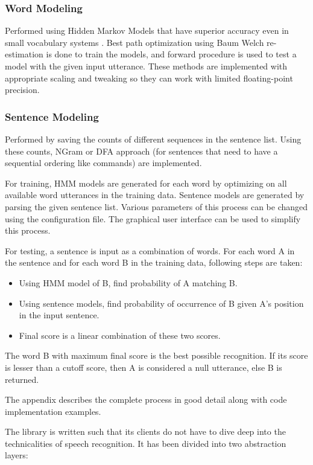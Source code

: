 \subsubsection{Word Modeling}
Performed using Hidden Markov Models that have superior accuracy \cite{Mustafa2017} even in small vocabulary systems \cite{10.1007/978-981-10-3920-1_46}. Best path optimization using Baum Welch re-estimation is done to train the models, and forward procedure is used to test a model with the given input utterance. These methods are implemented with appropriate scaling and tweaking so they can work with limited floating-point precision.

\subsubsection{Sentence Modeling}
Performed by saving the counts of different sequences in the sentence list. Using these counts, NGram or DFA approach (for sentences that need to have a sequential ordering like commands) are implemented.

For training, HMM models are generated for each word by optimizing on all available word utterances in the training data. Sentence models are generated by parsing the given sentence list. Various parameters of this process can be changed using the configuration file. The graphical user interface can be used to simplify this process.

For testing, a sentence is input as a combination of words. For each word A in the sentence and for each word B in the training data, following steps are taken:

\begin{itemize}
\item Using HMM model of B, find probability of A matching B.
\item Using sentence models, find probability of occurrence of B given A’s position in the input sentence.
\item Final score is a linear combination of these two scores.
\end{itemize}

The word B with maximum final score is the best possible recognition. If its score is lesser than a cutoﬀ score, then A is considered a null utterance, else B is returned.


The appendix describes the complete process in good detail along with code implementation examples.

\newpage

The library is written such that its clients do not have to dive deep into the technicalities of speech recognition. It has been divided into two abstraction layers:

